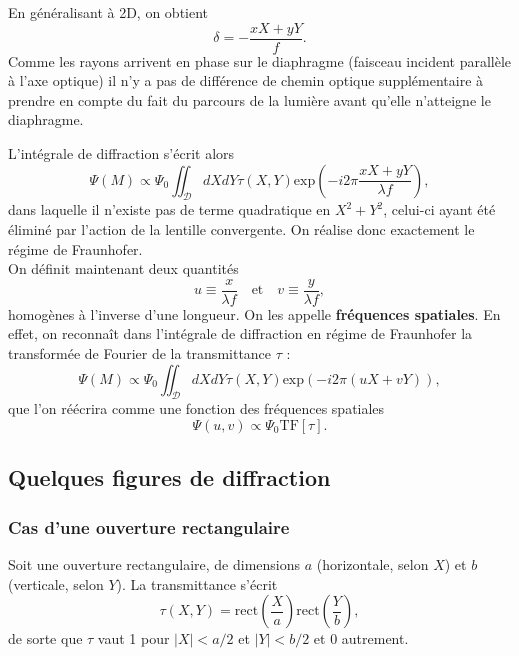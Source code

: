 \documentclass[11pt,a4paper]{report}
\begin{document}
En généralisant à 2D, on obtient
\begin{equation}
	\delta = - \frac{xX + yY}{f}.
\end{equation}
Comme les rayons arrivent en phase sur le diaphragme (faisceau incident parallèle à l'axe optique) il n'y a pas de différence de chemin optique supplémentaire à prendre en compte du fait du parcours de la lumière avant qu'elle n'atteigne le diaphragme.

L'intégrale de diffraction s'écrit alors
\begin{equation}
	\Psi(M) \propto \Psi_0 \iint_\mathcal{D} dXdY \tau(X,Y) \text{exp}\left( - i 2\pi \frac{xX + yY}{\lambda f}\right),
\end{equation}
dans laquelle il n'existe pas de terme quadratique en $X^2 + Y^2$, celui-ci ayant été éliminé par l'action de la lentille convergente. On réalise donc exactement le régime de Fraunhofer.\\

On définit maintenant deux quantités 
\begin{equation}
	u \equiv \frac{x}{\lambda f} \quad\text{et}\quad v \equiv \frac{y}{\lambda f},
\end{equation}
homogènes à l'inverse d'une longueur. On les appelle \textbf{fréquences spatiales}. En effet, on reconnaît dans l'intégrale de diffraction en régime de Fraunhofer la transformée de Fourier de la transmittance $\tau$ :
\begin{equation}
	\Psi(M) \propto \Psi_0 \iint_\mathcal{D} dXdY \tau(X,Y) \text{exp}\left( - i 2\pi \left( uX + vY \right) \right),
\end{equation}
que l'on réécrira comme une fonction des fréquences spatiales
\begin{equation}
	\Psi(u,v) \propto \Psi_0 \text{TF}\left[\tau \right].
\end{equation}

\newpage
\subsection{Quelques figures de diffraction}
 
\subsubsection{Cas d'une ouverture rectangulaire}

Soit une ouverture rectangulaire, de dimensions $a$ (horizontale, selon $X$) et $b$ (verticale, selon $Y$). La transmittance s'écrit
\begin{equation}
	\tau(X,Y) = \text{rect}\left(\frac{X}{a}\right)\text{rect}\left(\frac{Y}{b}\right),
\end{equation}
de sorte que $\tau$ vaut 1 pour $|X| < a/2$ et $|Y| < b/2$ et 0 autrement.\\
\end{document}
